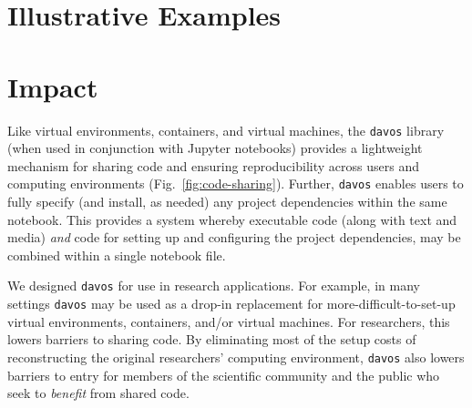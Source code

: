 \documentclass[preprint,12pt,a4paper]{elsarticle}
\begin{document}


\section{Illustrative Examples}



\section{Impact}

Like virtual environments, containers, and virtual machines, the
\texttt{davos} library (when used in conjunction with Jupyter
notebooks) provides a lightweight mechanism for sharing code and
ensuring reproducibility across users and computing environments
(Fig.~\ref{fig:code-sharing}). Further, \texttt{davos} enables users
to fully specify (and install, as needed) any project dependencies
within the same notebook. This provides a system whereby executable
code (along with text and media) \textit{and} code for setting up and
configuring the project dependencies, may be combined within a single
notebook file.

We designed \texttt{davos} for use in research applications. For
example, in many settings \texttt{davos} may be used as a drop-in
replacement for more-difficult-to-set-up virtual environments,
containers, and/or virtual machines. For researchers, this lowers
barriers to sharing code. By eliminating most of the setup costs
of reconstructing the original researchers' computing environment,
\texttt{davos} also lowers barriers to entry for members of
the scientific community and the public who seek to \textit{benefit}
from shared code.
\end{document}
